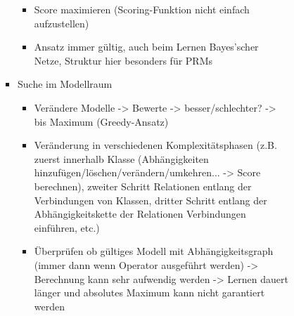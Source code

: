 \documentclass[paper=a4, fontsize=11pt]{scrartcl} %
\numberwithin{equation}{section} %
\numberwithin{figure}{section} %
\numberwithin{table}{section} %
\begin{document}
\begin{itemize}
\begin{itemize}
\begin{itemize}
\begin{itemize}
\begin{itemize}
\begin{itemize}
\item Score maximieren (Scoring-Funktion nicht einfach aufzustellen)
\item Ansatz immer gültig, auch beim Lernen Bayes'scher Netze, Struktur hier besonders für PRMs
\end{itemize}
\item Suche im Modellraum
\begin{itemize}
\item Verändere Modelle -> Bewerte -> besser/schlechter? -> bis Maximum (Greedy-Ansatz)
\item Veränderung in verschiedenen Komplexitätsphasen (z.B. zuerst innerhalb Klasse (Abhängigkeiten hinzufügen/löschen/verändern/umkehren... -> Score berechnen), zweiter Schritt Relationen entlang der Verbindungen von Klassen, dritter Schritt entlang der Abhängigkeitskette der Relationen Verbindungen einführen, etc.)
\item Überprüfen ob gültiges Modell mit Abhängigkeitsgraph (immer dann wenn Operator ausgeführt werden) -> Berechnung kann sehr aufwendig werden -> Lernen dauert länger und absolutes Maximum kann nicht garantiert werden
\end{itemize}
\end{itemize}
\end{itemize}
\end{itemize}
\end{itemize}
\end{itemize}
\end{document}
